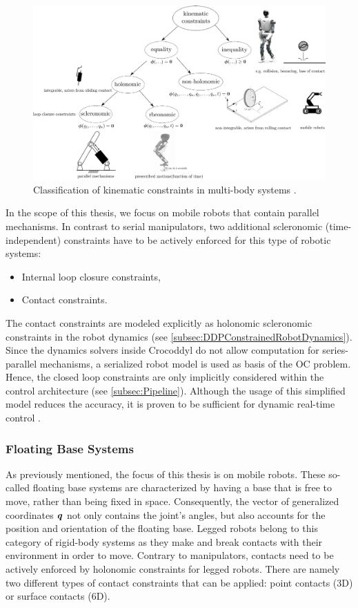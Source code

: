 \begin{figure}
\centering	
\includegraphics[width=1\textwidth]{img/constraints}
\caption[Kinematic constraints in multi-body systems]{Classification of kinematic constraints in multi-body systems \cite{kumar2019modular}.}
\label{img:constraints}
\end{figure} 

In the scope of this thesis, we focus on mobile robots that contain parallel mechanisms. In contrast to serial manipulators, two additional scleronomic (time-independent) constraints have to be actively enforced for this type of robotic systems:
\begin{itemize}
\item Internal loop closure constraints,
\item Contact constraints.
\end{itemize}

The contact constraints are  modeled explicitly as holonomic scleronomic constraints in the robot dynamics (see \cref{subsec:DDPConstrainedRobotDynamics}). Since the dynamics solvers inside Crocoddyl do not allow computation for series-parallel mechanisms, a serialized robot model is used as basis of the \gls{OC} problem. Hence, the closed loop constraints are only implicitly considered within the control architecture (see \cref{subsec:Pipeline}). Although the usage of this simplified model reduces the accuracy, it is proven to be sufficient for dynamic real-time control \cite{kumar2019model}.

\subsubsection{Floating Base Systems}
As previously mentioned, the focus of this thesis is on mobile robots. These so-called floating base systems are characterized by having a base that is free to move, rather than being fixed in space. Consequently, the vector of generalized coordinates $\bm{\mathit{q}}$ not only contains the joint's angles, but also accounts for the position and orientation of the floating base. Legged robots belong to this category of rigid-body systems as they make and break contacts with their environment in order to move. Contrary to manipulators, contacts need to be actively enforced by holonomic constraints for legged robots. There are namely two different types of contact constraints that can be applied: point contacts (3D) or surface contacts (6D). 

